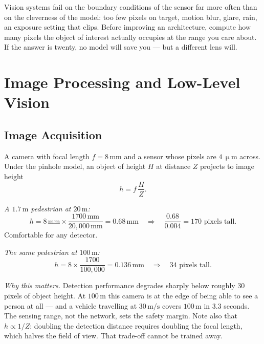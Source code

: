 \begin{engineernote}
Vision systems fail on the boundary conditions of the sensor far more often
than on the cleverness of the model: too few pixels on target, motion blur,
glare, rain, an exposure setting that clips. Before improving an architecture,
compute how many pixels the object of interest actually occupies at the range
you care about. If the answer is twenty, no model will save you --- but a
different lens will.
\end{engineernote}

\section{Image Processing and Low-Level Vision}

\subsection{Image Acquisition}

\begin{workedexample}
A camera with focal length $f = 8\,\text{mm}$ and a sensor whose pixels are
$4\,\upmu\text{m}$ across. Under the pinhole model, an object of height $H$ at
distance $Z$ projects to image height
\[
  h = f\,\frac{H}{Z} .
\]

\emph{A $1.7\,\text{m}$ pedestrian at $20\,\text{m}$:}
\[
  h = 8\,\text{mm}\times\frac{1700\,\text{mm}}{20{,}000\,\text{mm}}
    = 0.68\,\text{mm}
  \quad\Rightarrow\quad
  \frac{0.68}{0.004} = 170 \text{ pixels tall.}
\]
Comfortable for any detector.

\emph{The same pedestrian at $100\,\text{m}$:}
\[
  h = 8\times\frac{1700}{100{,}000} = 0.136\,\text{mm}
  \quad\Rightarrow\quad 34 \text{ pixels tall.}
\]

\emph{Why this matters.} Detection performance degrades sharply below roughly
$30$ pixels of object height. At $100\,\text{m}$ this camera is at the edge of
being able to see a person at all --- and a vehicle travelling at
$30\,\text{m/s}$ covers $100\,\text{m}$ in $3.3$ seconds. The sensing range,
not the network, sets the safety margin. Note also that $h \propto 1/Z$: doubling
the detection distance requires doubling the focal length, which halves the
field of view. That trade-off cannot be trained away.
\end{workedexample}

